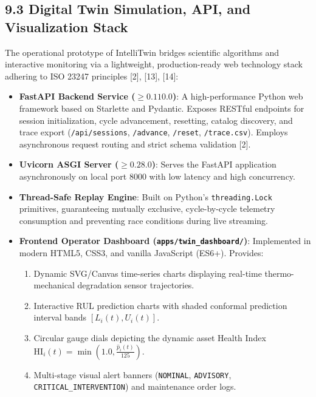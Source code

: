 \documentclass[12pt,a4paper]{article}
\begin{document}
\subsection*{9.3 Digital Twin Simulation, API, and Visualization Stack}
The operational prototype of IntelliTwin bridges scientific algorithms and interactive monitoring via a lightweight, production-ready web technology stack adhering to ISO 23247 principles [2], [13], [14]:
\begin{itemize}
    \item \textbf{FastAPI Backend Service ($\ge 0.110.0$)}: A high-performance Python web framework based on Starlette and Pydantic. Exposes RESTful endpoints for session initialization, cycle advancement, resetting, catalog discovery, and trace export (\texttt{/api/sessions}, \texttt{/advance}, \texttt{/reset}, \texttt{/trace.csv}). Employs asynchronous request routing and strict schema validation [2].
    \item \textbf{Uvicorn ASGI Server ($\ge 0.28.0$)}: Serves the FastAPI application asynchronously on local port 8000 with low latency and high concurrency.
    \item \textbf{Thread-Safe Replay Engine}: Built on Python's \texttt{threading.Lock} primitives, guaranteeing mutually exclusive, cycle-by-cycle telemetry consumption and preventing race conditions during live streaming.
    \item \textbf{Frontend Operator Dashboard (\texttt{apps/twin_dashboard/})}: Implemented in modern HTML5, CSS3, and vanilla JavaScript (ES6+). Provides:
    \begin{enumerate}
        \item Dynamic SVG/Canvas time-series charts displaying real-time thermo-mechanical degradation sensor trajectories.
        \item Interactive RUL prediction charts with shaded conformal prediction interval bands $[L_i(t), U_i(t)]$.
        \item Circular gauge dials depicting the dynamic asset Health Index $\text{HI}_i(t) = \min(1.0, \frac{\hat{p}_i(t)}{125})$.
        \item Multi-stage visual alert banners (\texttt{NOMINAL}, \texttt{ADVISORY}, \texttt{CRITICAL\_INTERVENTION}) and maintenance order logs.
    \end{enumerate}
\end{itemize}
\end{document}
